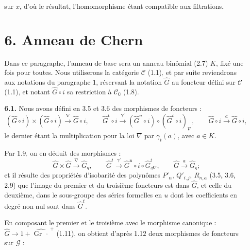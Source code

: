 sur \(x\), d'où le
résultat, l'homomorphisme étant compatible aux filtrations.

\section*{6. Anneau de Chern}

Dans ce paragraphe, l'anneau de base sera un anneau binômial (2.7) \(K\), fixé une fois pour toutes. Nous utiliserons la catégorie \(\mathcal C\) (1.1), et par suite reviendrons aux notations du paragraphe 1, réservant la notation \(\widehat G\) au foncteur défini sur \(\mathcal C\) (1.1), et notant \(\widehat G\circ i\) sa restriction à \(\mathcal C_0\) (1.8).

\textbf{6.1.} Nous avons défini en 3.5 et 3.6 des morphismes de foncteurs :
\[
  (\widehat G\circ i)\times(\widehat G\circ i)\xrightarrow{\nabla}\widehat G\circ i,
  \qquad
  \widehat G^t\circ i\xrightarrow{\gamma'}(\widehat G^u\circ i)\circ(\widehat G^t\circ i)_\nabla,
  \qquad
  \widehat G\circ i\xrightarrow{a}\widehat G\circ i,
\]
le dernier étant la multiplication pour la loi \(\nabla\) par \(\gamma_t(a)\), avec \(a\in K\).

Par 1.9, on en déduit des morphismes :
\[
  \widehat G\times\widehat G\xrightarrow{\nabla}\widehat G_g,
  \qquad
  \widehat G^t\xrightarrow{\gamma'}\widehat G^u\circ i\circ\widehat G^t_{g\nabla},
  \qquad
  \widehat G\xrightarrow{a}\widehat G_g;
\]
et il résulte des propriétés d'isobarité des polynômes \(P'_n\), \(Q'_{i,j}\), \(R_{n,a}\) (3.5, 3.6, 2.9) que l'image du premier et du troisième foncteurs est dans \(\widehat G\), et celle du deuxième, dans le sous-groupe des séries formelles en \(u\) dont les coefficients en degré non nul sont dans \(\widehat G^t\).

En composant le premier et le troisième avec le morphisme canonique : \(\widehat G\longrightarrow 1+\widehat{\operatorname{Gr}\,\cdot\,}^{+}\) (1.11), on obtient d'après 1.12 deux morphismes de
foncteurs sur \(\mathcal G\) :
